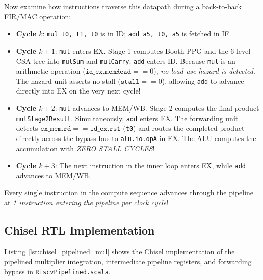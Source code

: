 Now examine how instructions traverse this datapath during a back-to-back FIR/MAC operation:
\begin{itemize}
    \item \textbf{Cycle $k$}: \texttt{mul t0, t1, t0} is in ID; \texttt{add a5, t0, a5} is fetched in IF.
    \item \textbf{Cycle $k+1$}: \texttt{mul} enters EX. Stage 1 computes Booth PPG and the 6-level CSA tree into \texttt{mulSum} and \texttt{mulCarry}. \texttt{add} enters ID. Because \texttt{mul} is an arithmetic operation ($\texttt{id\_ex.memRead} == 0$), \textit{no load-use hazard is detected}. The hazard unit asserts no stall ($\texttt{stall} == 0$), allowing \texttt{add} to advance directly into EX on the very next cycle!
    \item \textbf{Cycle $k+2$}: \texttt{mul} advances to MEM/WB. Stage 2 computes the final product \texttt{mulStage2Result}. Simultaneously, \texttt{add} enters EX. The forwarding unit detects $\texttt{ex\_mem.rd} == \texttt{id\_ex.rs1}$ (\texttt{t0}) and routes the completed product directly across the bypass bus to \texttt{alu.io.opA} in EX. The ALU computes the accumulation with \textit{ZERO STALL CYCLES}!
    \item \textbf{Cycle $k+3$}: The next instruction in the inner loop enters EX, while \texttt{add} advances to MEM/WB.
\end{itemize}
Every single instruction in the compute sequence advances through the pipeline at \textit{1 instruction entering the pipeline per clock cycle}!

\subsection{Chisel RTL Implementation}

Listing \ref{lst:chisel_pipelined_mul} shows the Chisel implementation of the pipelined multiplier integration, intermediate pipeline registers, and forwarding bypass in \texttt{RiscvPipelined.scala}.

